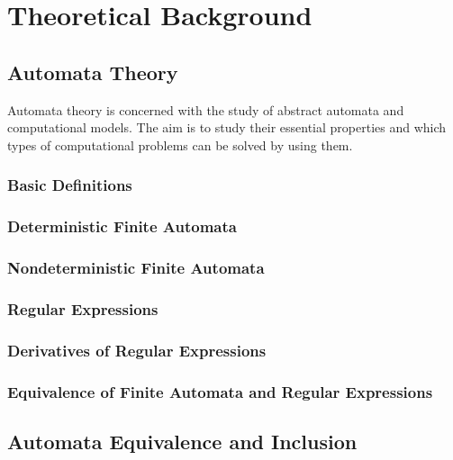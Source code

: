 \chapter{Theoretical Background}

\section{Automata Theory}

    Automata theory is concerned with the study of abstract automata and computational models.
    The aim is to study their essential properties and which types of computational problems can be solved by using them.

    \subsection{Basic Definitions}
    

    \subsection{Deterministic Finite Automata}
    

    \subsection{Nondeterministic Finite Automata}
    

    \subsection{Regular Expressions}
    

    \subsection{Derivatives of Regular Expressions}
    

    \subsection{Equivalence of Finite Automata and Regular Expressions}

\section{Automata Equivalence and Inclusion}

